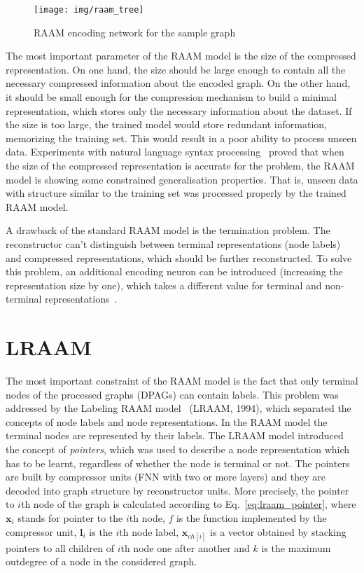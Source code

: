 \begin{figure}
\begin{center}
	\texttt{[image: img/raam\_tree]}
	\caption{RAAM encoding network for the sample graph}
	\label{fig:raam_tree}
\end{center}
\end{figure}

The most important parameter of the RAAM model is the size of the compressed representation. On one hand, the size should be large enough to contain all the necessary compressed information about the encoded graph. On the other hand, it should be small enough for the compression mechanism to build a minimal representation, which stores only the necessary information about the dataset. If the size is too large, the trained model would store redundant information, memorizing the training set. This would result in a poor ability to process unseen data. Experiments with natural language syntax processing~\cite{pollack1990recursive} proved that when the size of the compressed representation is accurate for the problem, the RAAM model is showing some constrained generalisation properties. That is, unseen data with structure similar to the training set was processed properly by the trained RAAM model.

A drawback of the standard RAAM model is the termination problem. The reconstructor can't distinguish between terminal representations (node labels) and compressed representations, which should be further reconstructed. To solve this problem, an additional encoding neuron can be introduced (increasing the representation size by one), which takes a different value for terminal and non-terminal representations~\cite{stolcke1992tree}.

\section{LRAAM}
The most important constraint of the RAAM model is the fact that only terminal nodes of the processed graphs (DPAGs) can contain labels. This problem was addressed by the Labeling RAAM model~\cite{sperduti1994labelling} (LRAAM, 1994), which separated the concepts of node labels and node representations. In the RAAM model the terminal nodes are represented by their labels. The LRAAM model introduced the concept of \emph{pointers}, which was used to describe a node representation which has to be learnt, regardless of whether the node is terminal or not. The pointers are built by compressor units (FNN with two or more layers) and they are decoded into graph structure by reconstructor units. More precisely, the pointer to $i$th node of the graph is calculated according to Eq.~\ref{eq:lraam_pointer}, where $\bm{x}_i$ stands for pointer to the $i$th node, $f$ is the function implemented by the compressor unit, $\bm{l}_i$ is the $i$th node label, $\bm{x}_{ch[i]}$ is a vector obtained by stacking pointers to all children of $i$th node one after another and $k$ is the maximum outdegree of a node in the considered graph.

